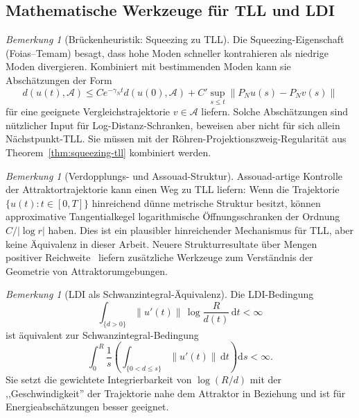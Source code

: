 \documentclass[12pt,a4paper]{article}
\theoremstyle{definition}
\theoremstyle{plain}
\theoremstyle{remark}
\newtheorem{remark}[definition]{Bemerkung}
\begin{document}
\subsection{Mathematische Werkzeuge für TLL und LDI}

\begin{remark}[Brückenheuristik: Squeezing zu TLL]
\label{rem:bridge-squeezing}
Die Squeezing-Eigenschaft (Foias--Temam) besagt, dass hohe Moden schneller kontrahieren als niedrige Moden divergieren. Kombiniert mit bestimmenden Moden kann sie Abschätzungen der Form
\[
  d(u(t),\mathcal{A})
  \le C e^{-\gamma_N t}d(u(0),\mathcal{A})
      + C'\sup_{s\le t}\|P_N u(s)-P_N v(s)\|
\]
für eine geeignete Vergleichstrajektorie $v\in\mathcal{A}$ liefern.
Solche Abschätzungen sind nützlicher Input für Log-Distanz-Schranken,
beweisen aber nicht für sich allein Nächstpunkt-TLL.  Sie müssen mit
der Röhren-Projektionszweig-Regularität aus
Theorem~\ref{thm:squeezing-tll} kombiniert werden.
\end{remark}

\begin{remark}[Verdopplungs- und Assouad-Struktur]
\label{rem:doubling-assouad}
Assouad-artige Kontrolle der Attraktortrajektorie kann einen Weg zu
TLL liefern: Wenn die Trajektorie $\{u(t):t\in[0,T]\}$ hinreichend
dünne metrische Struktur besitzt, können approximative Tangentialkegel
logarithmische Öffnungsschranken der Ordnung $C/|\log r|$ haben.  Dies
ist ein plausibler hinreichender Mechanismus für TLL, aber keine
Äquivalenz in dieser Arbeit.  Neuere Strukturresultate über Mengen
positiver Reichweite~\cite{Lytchak2024} liefern zusätzliche Werkzeuge
zum Verständnis der Geometrie von Attraktorumgebungen.
\end{remark}

\begin{remark}[LDI als Schwanzintegral-Äquivalenz]
\label{rem:ldi-tail}
Die LDI-Bedingung
\[
  \int_{\{d>0\}} \|u'(t)\|\,\log\frac{R}{d(t)}\,\mathrm{d}t < \infty
\]
ist äquivalent zur Schwanzintegral-Bedingung
\[
  \int_0^R \frac{1}{s}
  \left(
    \int_{\{0 < d \leq s\}} \|u'(t)\|\,\mathrm{d}t
  \right)\mathrm{d}s < \infty.
\]
Sie setzt die gewichtete Integrierbarkeit von $\log(R/d)$ mit der
,,Geschwindigkeit'' der Trajektorie nahe dem Attraktor in Beziehung
und ist für Energieabschätzungen besser geeignet.
\end{remark}
\end{document}
